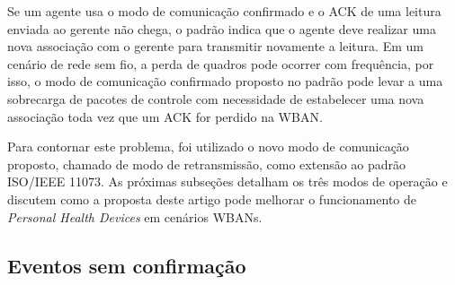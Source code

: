 
Se um agente usa o modo de comunicação confirmado e o ACK de uma leitura enviada ao gerente não chega, o padrão indica que o agente deve realizar uma nova associação com o gerente para transmitir novamente a leitura. Em um cenário de rede sem fio, a perda de quadros pode ocorrer com frequência, por isso, o modo de comunicação confirmado proposto no padrão pode levar a uma sobrecarga de pacotes de controle com necessidade de estabelecer uma nova associação toda vez que um ACK for perdido na WBAN.

Para contornar este problema, foi utilizado o novo modo de comunicação proposto, chamado de modo de retransmissão, como extensão ao padrão ISO/IEEE 11073. As próximas subseções detalham os três modos de operação e discutem como a proposta deste artigo pode melhorar o funcionamento de \textit{Personal Health Devices} em cenários WBANs.

\subsection{Eventos sem confirmação}\label{sec:UnconfirmedMeasurementEvent}

